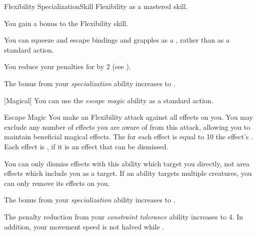     \begin{feat}{Flexibility Specialization}{Skill}
        \featpre Flexibility as a mastered skill.

         You gain a  bonus to the Flexibility skill.

         You can squeeze and escape bindings and grapples as a , rather than as a standard action.

         You reduce your penalties for  by 2 (see ).

         The bonus from your \textit{specialization} ability increases to .

        [Magical] You can use the \textit{escape magic} ability as a standard action.
        \begin{freeability}{Escape Magic}
            You make an Flexibility attack against all  effects on you.
            You may exclude any number of effects you are aware of from this attack, allowing you to maintain beneficial magical effects.
            The  for each effect is equal to 10 \add the effect's .
            \hit Each effect is , if it is an effect that can be dismissed.
        \end{freeability}

        You can only dismiss effects with this ability which target you directly, not area effects which include you as a target.
        If an ability targets multiple creatures, you can only remove its effects on you.

         The bonus from your \textit{specialization} ability increases to .

         The penalty reduction from your \textit{constraint tolerance} ability increases to 4.
        In addition, your movement speed is not halved while .
    \end{feat}

